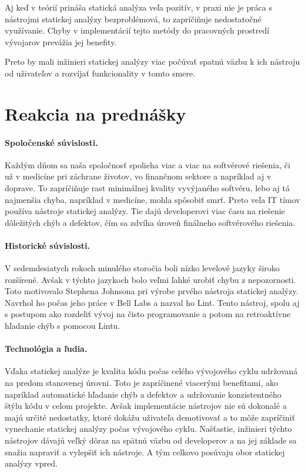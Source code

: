 \documentclass[10pt,twoside,slovak,a4paper]{article}
\begin{document}
Aj keď v teórií prináša statická analýza veľa pozitív, v praxi nie je práca s nástrojmi statickej analýzy
bezproblémová, to zapríčiňuje nedostatočné využívanie. Chyby v implementácií tejto metódy do pracovných prostredí
vývojarov prevážia jej benefity.

Preto by mali inžinieri statickej analýzy viac počúvať spatnú väzbu k ich nástroju od uživateľov a rozvíjať
funkcionality v tomto smere.

\section*{Reakcia na prednášky}
\paragraph{Spoločenské súvislosti.}
Každým dňom sa naša spoločnosť spolieha viac a viac na softvérové riešenia, či už v medicíne pri záchrane životov,
vo finančnom sektore a napríklad aj v doprave. To zapríčiňuje rast minimálnej kvality vyvýjaného softvéru, lebo aj
tá najmenšia chyba, napríklad v medicíne, mohla spôsobiť smrť. Preto veľa IT tímov používa nástroje statickej analýzy.
Tie dajú developerovi viac času na riešenie dôležitých chýb a defektov, čím sa zdvíha úroveň finálneho softvérového
riešenia.

\paragraph{Historické súvislosti.}
V sedemdesiatych rokoch minulého storočia boli nízko levelové jazyky široko rozšírené. Avšak v týchto jazykoch
bolo veľmi ľahké urobiť chybu z nepozornosti. Toto motivovalo Stephena Johnsona pri výrobe prvého nástroja statickej
analýzy. Navrhol ho počas jeho práce v Bell Labs a nazval ho Lint. Tento nástroj, spolu aj s postupom ako rozdeliť
vývoj na čisto programovanie a potom na retroaktívne hľadanie chýb s pomocou Lintu.~\cite{Lint}

\paragraph{Technológia a ľudia.}
Vďaka statickej analýze je kvalita kódu počas celého vývojového cyklu udržovaná na predom stanovenej úrovni. Toto je
zapríčinené viacerými benefitami, ako napríklad automatické hľadanie chýb a defektov a udržovanie konzistentného
štýlu kódu v celom projekte. Avšak implementácie nástrojov nie sú dokonalé a majú určité nedostatky, ktoré
dokážu uživateľa demotivovať a to môže zapríčiniť vynechanie statickej analýzy počas vývojového cyklu. Našťastie,
inžinieri týchto nástrojov dávajú veľký dôraz na spätnú väzbu od developerov a na jej základe sa snažia napraviť a
vylepšiť ich nástroje. A tým celkovo posúvaju obor statickej analýzy vpred.
\end{document}
